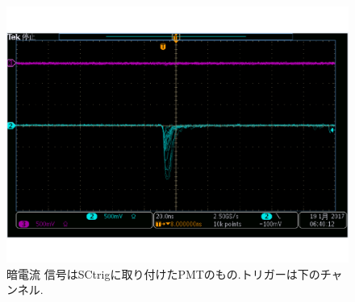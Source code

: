 \begin{figure}[H]
\centering
\includegraphics[keepaspectratio,scale=0.3]{fig/ybm/oscillo2.pdf}
\caption{暗電流\newline
信号はSCtrigに取り付けたPMTのもの.トリガーは下のチャンネル.}
\label{fig:oscillo2}
\end{figure}

